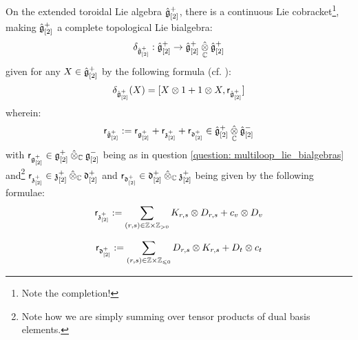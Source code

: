             \begin{corollary} \label{coro: extended_toroidal_lie_bialgebras}
                On the extended toroidal Lie algebra $\hat{\mathfrak{g}}_{[2]}^+$, there is a continuous Lie cobracket\footnote{Note the completion!}, making $\hat{\mathfrak{g}}_{[2]}^+$ a complete topological Lie bialgebra:
                    $$\delta_{\hat{\g}_{[2]}^+}: \hat{\g}_{[2]}^+ \to \hat{\g}_{[2]}^+ \hattensor_{\bbC} \hat{\g}_{[2]}^+$$
                given for any $X \in \hat{\mathfrak{g}}_{[2]}^+$ by the following formula (cf. \cite{etingof_kazhdan_quantisation_1}):
                    $$\delta_{\hat{\g}_{[2]}^+}(X) = [ X \tensor 1 + 1 \tensor X, \sfr_{\hat{\g}_{[2]}^+} ]$$
                wherein:
                    $$\sfr_{\hat{\g}_{[2]}^+} := \sfr_{\g_{[2]}^+} + \sfr_{\z_{[2]}^+} + \sfr_{\d_{[2]}^+} \in \hat{\g}_{[2]}^+ \hattensor_{\bbC} \hat{\g}_{[2]}^-$$
                with $\sfr_{\g_{[2]}^+} \in \g_{[2]}^+ \hattensor_{\bbC} \g_{[2]}^-$ being as in question \ref{question: multiloop_lie_bialgebras} and\footnote{Note how we are simply summing over tensor products of dual basis elements.} $\sfr_{\z_{[2]}^+} \in \z_{[2]}^+ \hattensor_{\bbC} \d_{[2]}^+$ and $\sfr_{\d_{[2]}^+} \in \d_{[2]}^+ \hattensor_{\bbC} \z_{[2]}^+$ being given by the following formulae:
                    $$\sfr_{\z_{[2]}^+} := \sum_{(r, s) \in \Z \x \Z_{> 0}} K_{r, s} \tensor D_{r, s} + c_v \tensor D_v$$
                    
                    $$\sfr_{\d_{[2]}^+} := \sum_{(r, s) \in \Z \x \Z_{\leq 0}} D_{r, s} \tensor K_{r, s} + D_t \tensor c_t$$
            \end{corollary}

